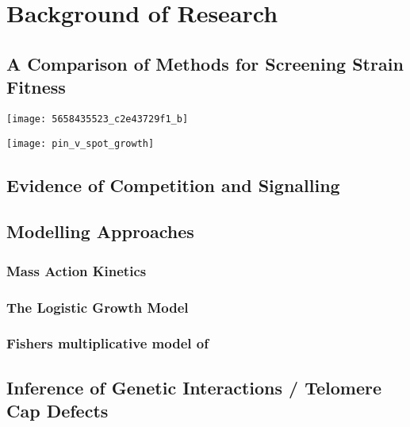 \graphicspath{{images/}}

\section{Background of Research}
\label{sec:background}

\subsection{A Comparison of Methods for Screening Strain Fitness }



\begin{Figure}
  \centering
  \texttt{[image: 5658435523\_c2e43729f1\_b]}
\end{Figure}


\begin{Figure}
  \centering
\end{Figure}

\begin{Figure}
  \centering
  \texttt{[image: pin\_v\_spot\_growth]}
\end{Figure}


\subsection{Evidence of Competition and Signalling}

\subsection{Modelling Approaches}

\subsubsection{Mass Action Kinetics}
\subsubsection{The Logistic Growth Model}
\subsubsection{Fishers multiplicative model of }

\subsection{Inference of Genetic Interactions / Telomere Cap Defects}


